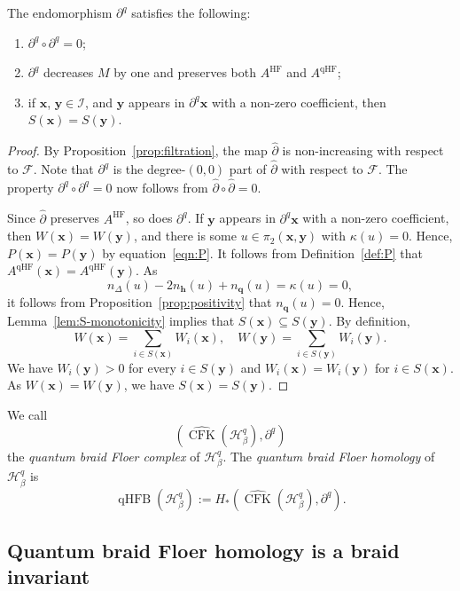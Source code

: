 \documentclass[11pt]{amsart}
\numberwithin{equation}{section}
\numberwithin{figure}{section}
\theoremstyle{definition}
\newcommand{\cF}{\mathcal{F}}
\newcommand{\cH}{\mathcal{H}}
\newcommand{\cI}{\mathcal{I}}
\newcommand{\ph}{\widehat{\partial}}
\DeclareMathOperator{\qHF}{qHF}
\DeclareMathOperator{\qHFB}{qHFB}
\DeclareMathOperator{\CFK}{CFK}
\newcommand{\CFKh}{\widehat{\CFK}}
\DeclareMathOperator{\HF}{HF}
\newcommand{\hs}{\boldsymbol{h}}
\newcommand{\qs}{\boldsymbol{q}}
\newcommand{\xs}{\boldsymbol{x}}
\newcommand{\ys}{\boldsymbol{y}}
\begin{document}
\begin{prop}\label{prop:quantum-differential}
    The endomorphism $\partial^q$ satisfies the following:
    \begin{enumerate}
        \item\label{it:differential} $\partial^q \circ \partial^q = 0$;
        \item\label{it:triply-graded} $\partial^q$ decreases $M$ by one and preserves both $A^{\HF}$ and $A^{\qHF}$;
        \item\label{it:S} if $\xs$, $\ys \in \cI$, and $\ys$ appears in $\partial^q \xs$ with a non-zero coefficient, then $S(\xs) = S(\ys)$.
    \end{enumerate}
\end{prop}

\begin{proof}
    By Proposition~\ref{prop:filtration}, the map $\ph$ is non-increasing with respect to $\cF$. Note that $\partial^q$ is the degree-$(0,0)$ part of $\ph$ with respect to $\cF$. The property $\partial^q \circ \partial^q = 0$ now follows from $\ph \circ \ph = 0$.

    Since $\ph$ preserves $A^{\HF}$, so does $\partial^q$. If $\ys$ appears in $\partial^q \xs$ with a non-zero coefficient, then $W(\xs) = W(\ys)$, and there is some $u \in \pi_2(\xs,\ys)$ with $\kappa(u) = 0$. Hence, $P(\xs) = P(\ys)$ by equation~\eqref{eqn:P}. It follows from Definition~\ref{def:P} that $A^{\qHF}(\xs) = A^{\qHF}(\ys)$. As 
    \[
    n_\Delta(u) - 2n_{\hs}(u) + n_{\qs}(u) = \kappa(u) = 0, 
    \]
    it follows from Proposition~\ref{prop:positivity} that $n_{\qs}(u) = 0$. Hence, Lemma~\ref{lem:S-monotonicity} implies that $S(\xs) \subseteq S(\ys)$. By definition, 
    \[
    W(\xs) = \sum_{i \in S(\xs)} W_i(\xs), \quad
    W(\ys) = \sum_{i \in S(\ys)} W_i(\ys).
    \]
    We have $W_i(\ys) > 0$ for every $i \in S(\ys)$ and $W_i(\xs) = W_i(\ys)$ for $i \in S(\xs)$. As $W(\xs) = W(\ys)$, we have $S(\xs) = S(\ys)$. 
\end{proof}

\begin{defn}
    We call
    \[
    \left(\CFKh(\cH^q_\beta), \partial^q\right)
    \]
    the \emph{quantum braid Floer complex} of $\cH^q_\beta$. The \emph{quantum braid Floer homology} of $\cH^q_\beta$ is
    \[
    \qHFB(\cH^q_\beta) := H_*\left(\CFKh(\cH^q_\beta), \partial^q\right).
    \]
\end{defn}


\subsection{Quantum braid Floer homology is a braid invariant}
\end{document}
